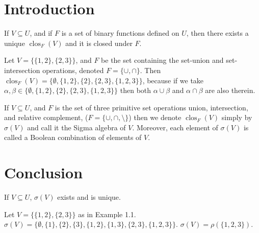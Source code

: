 \documentclass[a4paper,12pt]{article}
\begin{document}
	
	\section{Introduction}
	
	\begin{theorem}
		If $V \subseteq U$, and if $F$ is a set of binary functions defined on $U$, then there exists a unique $\operatorname{clos}_F(V)$ and it is closed under $F$.
	\end{theorem}
	
	\begin{example}
		Let $V = \{\{1,2\}, \{2,3\}\}$, and $F$ be the set containing the set-union and set-intersection operations, denoted $F = \{\cup, \cap\}$. Then $\operatorname{clos}_F(V) = \{\emptyset, \{1,2\}, \{2\}, \{2,3\}, \{1,2,3\}\}$, because if we take $\alpha, \beta \in \{\emptyset, \{1,2\}, \{2\}, \{2,3\}, \{1,2,3\}\}$ then both $\alpha \cup \beta$ and $\alpha \cap \beta$ are also therein.
	\end{example}
	
	\begin{lemma}
		If $V \subseteq U$, and $F$ is the set of three primitive set operations union, intersection, and relative complement, ($F = \{\cup, \cap, \setminus\}$) then we denote $\operatorname{clos}_F(V)$ simply by $\sigma(V)$ and call it the Sigma algebra of $V$. Moreover, each element of $\sigma(V)$ is called a Boolean combination of elements of $V$.
	\end{lemma}
	
	\section{Conclusion}
	
	\begin{corollary}
		If $V \subseteq U$, $\sigma(V)$ exists and is unique.
	\end{corollary}
	
	\begin{definition}
		Let $V = \{\{1,2\}, \{2,3\}\}$ as in Example 1.1. $\sigma(V) = \{\emptyset, \{1\}, \{2\}, \{3\}, \{1,2\}, \{1,3\}, \{2,3\}, \{1,2,3\}\}$. $\sigma(V) = \rho(\{1,2,3\})$.
	\end{definition}
	
\end{document}

